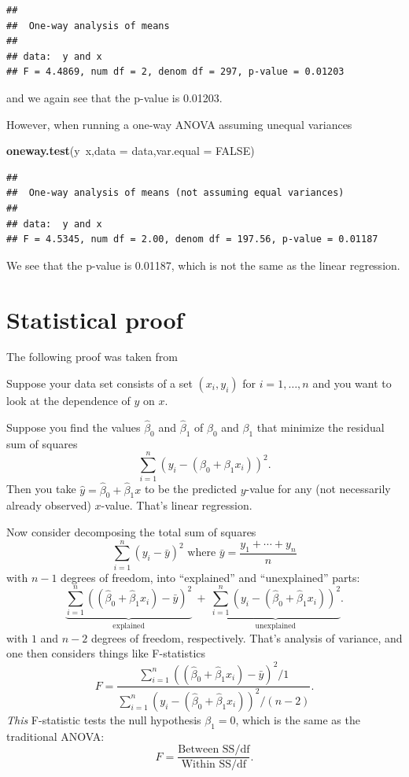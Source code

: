 \documentclass[]{book}
\newenvironment{Shaded}{\begin{snugshade}}{\end{snugshade}}
\newcommand{\KeywordTok}[1]{\textcolor[rgb]{0.13,0.29,0.53}{\textbf{{#1}}}}
\newcommand{\DataTypeTok}[1]{\textcolor[rgb]{0.13,0.29,0.53}{{#1}}}
\newcommand{\OtherTok}[1]{\textcolor[rgb]{0.56,0.35,0.01}{{#1}}}
\newcommand{\NormalTok}[1]{{#1}}
\theoremstyle{definition}
\theoremstyle{definition}
\theoremstyle{remark}
\begin{document}
\begin{verbatim}
## 
##  One-way analysis of means
## 
## data:  y and x
## F = 4.4869, num df = 2, denom df = 297, p-value = 0.01203
\end{verbatim}

and we again see that the p-value is 0.01203.

However, when running a one-way ANOVA assuming unequal variances

\begin{Shaded}
\begin{Highlighting}[]
\KeywordTok{oneway.test}\NormalTok{(y~x,}\DataTypeTok{data =} \NormalTok{data,}\DataTypeTok{var.equal =} \OtherTok{FALSE}\NormalTok{)}
\end{Highlighting}
\end{Shaded}

\begin{verbatim}
## 
##  One-way analysis of means (not assuming equal variances)
## 
## data:  y and x
## F = 4.5345, num df = 2.00, denom df = 197.56, p-value = 0.01187
\end{verbatim}

We see that the p-value is 0.01187, which is not the same as the linear
regression.

\section{Statistical proof}\label{statistical-proof}

The following proof was taken from \citep{hardy_difference_2012}

Suppose your data set consists of a set \((x_i,y_i)\) for
\(i=1,\ldots,n\) and you want to look at the dependence of \(y\) on
\(x\).

Suppose you find the values \(\hat\beta_0\) and \(\hat\beta_1\) of
\(\beta_0\) and \(\beta_1\) that minimize the residual sum of squares \[
\sum_{i=1}^n (y_i - (\beta_0+\beta_1 x_i))^2.
\] Then you take \(\hat y = \hat\beta_0+ \hat\beta_1 x\) to be the
predicted \(y\)-value for any (not necessarily already observed)
\(x\)-value. That's linear regression.

Now consider decomposing the total sum of squares \[
\sum_{i=1}^n (y_i - \bar y)^2 \text{ where }\bar y = \frac{y_1+\cdots+y_n}{n}
\] with \(n-1\) degrees of freedom, into ``explained'' and
``unexplained'' parts: \[
\underbrace{\sum_{i=1}^n ((\hat\beta_0+\hat\beta_1 x_i) - \bar y)^2}_{\text{explained}}\  +\  \underbrace{\sum_{i=1}^n (y_i - (\hat\beta_0+\hat\beta_1 x_i))^2}_{\text{unexplained}}.
\] with \(1\) and \(n-2\) degrees of freedom, respectively. That's
analysis of variance, and one then considers things like F-statistics \[
F = \frac{\sum_{i=1}^n ((\hat\beta_0+\hat\beta_1 x_i) - \bar y)^2/1}{\sum_{i=1}^n (y_i - (\hat\beta_0+\hat\beta_1 x_i))^2/(n-2)}.
\] \emph{This} F-statistic tests the null hypothesis \(\beta_1=0\),
which is the same as the traditional ANOVA: \[
F = \frac{\text{Between SS}/\text{df}}{\text{Within SS}/\text{df}}.
\]
\end{document}
